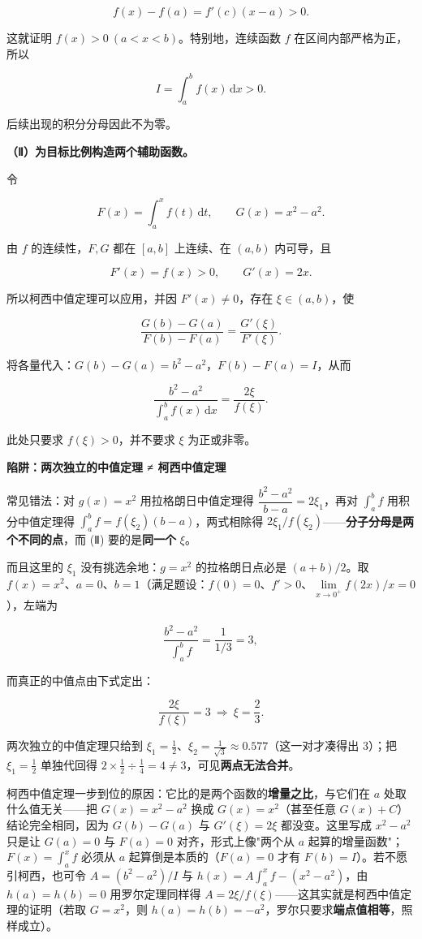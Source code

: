 \documentclass[UTF8,11pt,fontset=windows]{ctexart}
\begin{document}
$$
f(x)-f(a)=f'(c)(x-a)>0.
$$

这就证明 $\boxed{f(x)>0\ (a<x<b)}$。特别地，连续函数 $f$ 在区间内部严格为正，所以

$$
I=\int_a^b f(x)\,\mathrm dx>0.
$$

后续出现的积分分母因此不为零。

\textbf{（Ⅱ）为目标比例构造两个辅助函数。}

令

$$
F(x)=\int_a^x f(t)\,\mathrm dt,
\qquad G(x)=x^2-a^2.
$$

由 $f$ 的连续性，$F,G$ 都在 $[a,b]$ 上连续、在 $(a,b)$ 内可导，且

$$
F'(x)=f(x)>0,\qquad G'(x)=2x.
$$

所以柯西中值定理可以应用，并因 $F'(x)\ne0$，存在 $\xi\in(a,b)$，使

$$
\frac{G(b)-G(a)}{F(b)-F(a)}
=\frac{G'(\xi)}{F'(\xi)}.
$$

将各量代入：$G(b)-G(a)=b^2-a^2$，$F(b)-F(a)=I$，从而

$$
\boxed{\frac{b^2-a^2}{\displaystyle\int_a^b f(x)\,\mathrm dx}
=\frac{2\xi}{f(\xi)}.}
$$

此处只要求 $f(\xi)>0$，并不要求 $\xi$ 为正或非零。

{\bfseries 陷阱：两次独立的中值定理 ≠ 柯西中值定理\par}
常见错法：对 $g(x)=x^{2}$ 用拉格朗日中值定理得 $\dfrac{b^{2}-a^{2}}{b-a}=2\xi_1$，再对 $\displaystyle\int_a^b f$ 用积分中值定理得 $\displaystyle\int_a^b f=f(\xi_2)(b-a)$，两式相除得 $2\xi_1/f(\xi_2)$——\textbf{分子分母是两个不同的点}，而 (Ⅱ) 要的是\textbf{同一个} $\xi$。

而且这里的 $\xi_1$ 没有挑选余地：$g=x^{2}$ 的拉格朗日点必是 $(a+b)/2$。取 $f(x)=x^{2}$、$a=0$、$b=1$（满足题设：$f(0)=0$、$f'>0$、$\lim\limits_{x\to0^{+}}f(2x)/x=0$），左端为

$$\frac{b^{2}-a^{2}}{\displaystyle\int_a^b f}=\frac{1}{1/3}=3,$$

而真正的中值点由下式定出：

$$\frac{2\xi}{f(\xi)}=3\ \Longrightarrow\ \xi=\frac23 .$$

两次独立的中值定理只给到 $\xi_1=\frac12$、$\xi_2=\frac1{\sqrt3}\approx0.577$（这一对才凑得出 3）；把 $\xi_1=\frac12$ 单独代回得 $2\times\frac12\div\frac14=4\ne3$，可见\textbf{两点无法合并}。

柯西中值定理一步到位的原因：它比的是两个函数的\textbf{增量之比}，与它们在 $a$ 处取什么值无关——把 $G(x)=x^{2}-a^{2}$ 换成 $G(x)=x^{2}$（甚至任意 $G(x)+C$）结论完全相同，因为 $G(b)-G(a)$ 与 $G'(\xi)=2\xi$ 都没变。这里写成 $x^{2}-a^{2}$ 只是让 $G(a)=0$ 与 $F(a)=0$ 对齐，形式上像"两个从 $a$ 起算的增量函数"；$F(x)=\int_a^x f$ 必须从 $a$ 起算倒是本质的（$F(a)=0$ 才有 $F(b)=I$）。若不愿引柯西，也可令 $A=(b^{2}-a^{2})/I$ 与 $h(x)=A\displaystyle\int_a^x f-(x^{2}-a^{2})$，由 $h(a)=h(b)=0$ 用罗尔定理同样得 $A=2\xi/f(\xi)$——这其实就是柯西中值定理的证明（若取 $G=x^{2}$，则 $h(a)=h(b)=-a^{2}$，罗尔只要求\textbf{端点值相等}，照样成立）。
\end{document}
